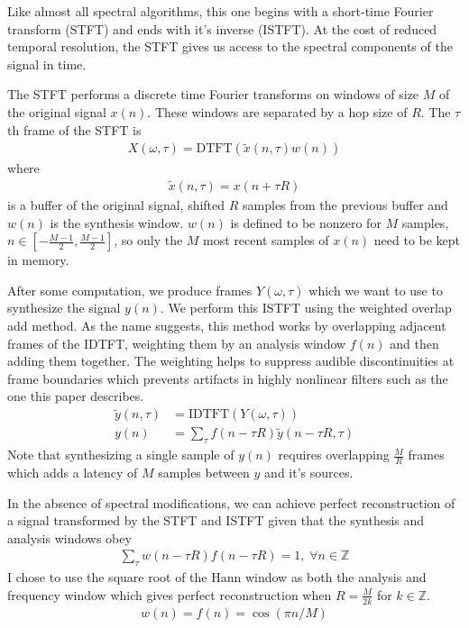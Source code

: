 \documentclass[12pt]{article}
\begin{document}
Like almost all spectral algorithms, this one begins with a short-time Fourier transform (STFT) and ends with it's inverse (ISTFT).
At the cost of reduced temporal resolution, the STFT gives us access to the spectral components of the signal in time.

The STFT performs a discrete time Fourier transforms on windows of size $M$ of the original signal $x(n)$.
These windows are separated by a hop size of $R$. The $\tau$th frame of the STFT is
\begin{align}
  X(\omega, \tau) = 
  \text{DTFT}(\tilde{x}(n, \tau)w(n))
\end{align}
where
\begin{align}
  \tilde{x}(n,\tau) = x(n + \tau R)
\end{align}
is a buffer of the original signal, shifted $R$ samples from the previous buffer and $w(n)$ is the synthesis window.
$w(n)$ is defined to be nonzero for $M$ samples, 
$n\in\left[-\frac{M - 1}{2}, \frac{M - 1}{2}\right]$, so only the $M$ most recent samples of $x(n)$ need to be kept in memory.

After some computation, 
we produce frames $Y(\omega, \tau)$ 
which we want to use to synthesize the signal $y(n)$.
We perform this ISTFT using the weighted overlap add method.
As the name suggests, this method works by
overlapping adjacent frames of the IDTFT, 
weighting them by an analysis window $f(n)$ 
and then adding them together.
The weighting helps to suppress audible discontinuities at frame boundaries
which prevents artifacts in highly nonlinear filters such as the one this paper describes.
\begin{align}
  \tilde{y}(n,\tau) &= \text{IDTFT}(Y(\omega, \tau))
  \\
  y(n) &= \sum_\tau f(n - \tau R)\tilde{y}(n - \tau R,\tau)
\end{align}
Note that synthesizing a single sample of $y(n)$ requires overlapping
$\frac{M}{R}$ frames which adds a latency of $M$ samples between $y$ and it's sources.

In the absence of spectral modifications, 
we can achieve perfect reconstruction 
of a signal transformed by the STFT and ISTFT given
that the synthesis and analysis windows obey
\begin{align}
  \sum_\tau w(n - \tau R)f(n - \tau R) = 1,\; \forall n\in \mathbb{Z}
\end{align}
I chose to use the square root of the Hann window as both the analysis and frequency window
which gives perfect reconstruction when $R = \frac{M}{2k}$ for $k\in\mathbb{Z}$.
\begin{align}
  w(n) = 
  f(n) =
  \cos(\pi n / M)
\end{align}
\end{document}
